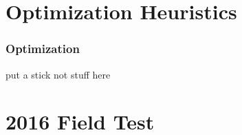 \documentclass[mathserif]{beamer}
\begin{document}

\section{Optimization Heuristics}
%
%
\begin{frame}
 \frametitle{Optimization}

put a stick not stuff here

\end{frame}



\section{2016 Field Test}
%
%

\end{document}
